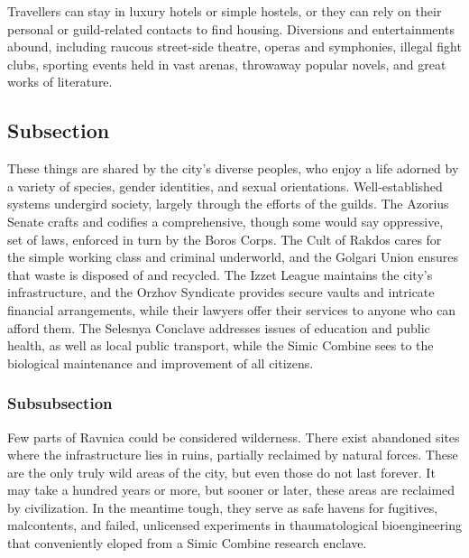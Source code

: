 Travellers can stay in luxury hotels or simple hostels, or they can rely on
their personal or guild-related contacts to find housing. 
Diversions and entertainments abound, including raucous street-side theatre,
operas and symphonies, illegal fight clubs, sporting events held in vast
arenas, throwaway popular novels, and great works of literature.

\subsection{Subsection}
These things are shared by the city's diverse peoples, who enjoy a life adorned
by a variety of  species, gender identities, and sexual orientations.
Well-established systems undergird society, largely through the efforts of the
guilds. The Azorius Senate crafts and codifies a comprehensive, though some
would say oppressive, set of laws, enforced in turn by the Boros Corps. The Cult
of Rakdos cares for the simple working class and criminal underworld, and the
Golgari Union ensures that waste is disposed of and recycled. The Izzet League
maintains the city's infrastructure, and the Orzhov Syndicate provides secure
vaults and intricate financial arrangements, while their lawyers offer their
services to anyone who can afford them. The Selesnya Conclave addresses issues
of education and public health, as well as local public transport, while the
Simic Combine sees to the biological maintenance and improvement of all
citizens. 

\subsubsection{Subsubsection}
Few parts of Ravnica could be considered wilderness. There exist abandoned sites
where the infrastructure lies in ruins, partially reclaimed by natural forces.
These are the only truly wild areas of the city, but even those do not last
forever. It may take a hundred years or more, but sooner or later, these areas
are reclaimed by civilization. In the meantime tough, they serve as safe havens
for fugitives, malcontents, and failed, unlicensed experiments in
thaumatological bioengineering that conveniently eloped from a Simic Combine
research enclave.

